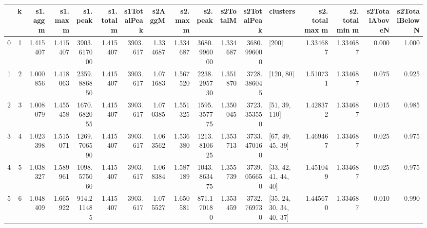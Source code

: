 \begin{tabular}{lrrrrrrrrrrrlrrrr}
\toprule
{} &  k &  s1. agg m &  s1. max m &     s1. peak &  s1. total m &  s1TotalPeak &    s2AggM &  s2. max m &     s2. peak &  s2TotalM &  s2TotalPeak &                  clusters &  s2. total max m &  s2. total min m &  s2TotalAboveN &  s2TotalBelowN \\
\midrule
0 &  1 &   1.415407 &   1.415407 &  3903.617000 &     1.415407 &     3903.617 &  1.334687 &   1.334687 &  3680.996000 &  1.334687 &  3680.996000 &                     [200] &         1.334687 &         1.334687 &          0.000 &          1.000 \\
1 &  2 &   1.000856 &   1.418063 &  2359.886850 &     1.415407 &     3903.617 &  1.071683 &   1.567520 &  2238.295730 &  1.351870 &  3728.386045 &                 [120, 80] &         1.510731 &         1.334687 &          0.075 &          0.925 \\
2 &  3 &   1.008079 &   1.455458 &  1670.682055 &     1.415407 &     3903.617 &  1.070385 &   1.551325 &  1595.357775 &  1.350045 &  3723.353550 &             [51, 39, 110] &         1.428372 &         1.334687 &          0.015 &          0.985 \\
3 &  4 &   1.023398 &   1.515071 &  1269.706590 &     1.415407 &     3903.617 &  1.063562 &   1.536380 &  1213.810625 &  1.353713 &  3733.470160 &          [67, 49, 45, 39] &         1.469467 &         1.334687 &          0.025 &          0.975 \\
4 &  5 &   1.038327 &   1.589961 &  1098.575060 &     1.415407 &     3903.617 &  1.068384 &   1.587189 &  1043.863475 &  1.355739 &  3739.056650 &      [33, 42, 41, 44, 40] &         1.451049 &         1.334687 &          0.025 &          0.975 \\
5 &  6 &   1.048409 &   1.665922 &   914.211485 &     1.415407 &     3903.617 &  1.075527 &   1.650581 &   871.170180 &  1.353459 &  3732.769730 &  [35, 24, 30, 34, 40, 37] &         1.445670 &         1.334687 &          0.010 &          0.990 \\
\bottomrule
\end{tabular}
